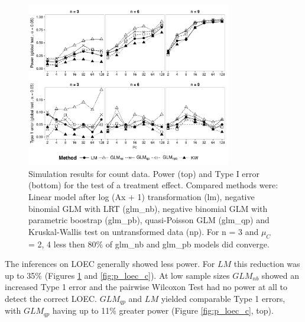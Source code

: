 \documentclass{scrartcl}
\begin{document}
\begin{figure}
  \centering
  \includegraphics[width = 0.8\textwidth]{p_glob_c.pdf}
  \caption{Simulation results for count data. Power (top) and Type I error (bottom) for the test of a treatment effect. Compared methods were: Linear model after log (Ax + 1) transformation (lm), negative binomial GLM with LRT (glm\_nb), negative binomial GLM with parametric boostrap (glm\_pb), quasi-Poisson GLM (glm\_qp) and Kruskal-Wallis test on untransformed data (np).
  For n = 3 and $\mu_C$ = {2, 4} less then 80\% of glm\_nb and glm\_pb models did converge.}
  \label{fig:p_glob_c}
\end{figure}

The inferences on LOEC generally showed less power.
For $LM$ this reduction was up to 35\% (Figures \ref{fig:p_glob_c} and \ref{fig:p_loec_c}).
At low sample sizes $GLM_{nb}$ showed an increased Type 1 error and the pairwise Wilcoxon Test had no power at all to detect the correct LOEC.
$GLM_{qp}$ and $LM$ yielded comparable Type 1 errors, with $GLM_{qp}$ having up to 11\% greater power (Figure \ref{fig:p_loec_c}, top).
\end{document}

